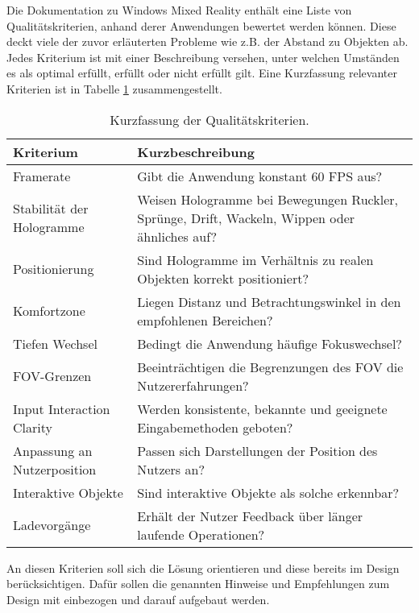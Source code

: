 Die Dokumentation zu Windows Mixed Reality enthält eine Liste von Qualitätskriterien, anhand derer Anwendungen bewertet werden können. Diese deckt viele der zuvor erläuterten Probleme wie z.B. der Abstand zu Objekten ab. Jedes Kriterium ist mit einer Beschreibung versehen, unter welchen Umständen es als optimal erfüllt, erfüllt oder nicht erfüllt gilt. Eine Kurzfassung relevanter Kriterien ist in Tabelle \ref{tab:tech_criteria} zusammengestellt.\\

\bgroup
\setlength\extrarowheight{-2pt}
\def\arraystretch{1.8}
\begin{table}[H]
	\centering
	\begin{tabular}{m{2.3cm}|m{8.5cm}}
		Kriterium & Kurzbeschreibung \\
		\hline
		\hline
		Framerate & Gibt die Anwendung konstant 60 FPS aus?\\
		\hline
		Stabilität der Hologramme & Weisen Hologramme bei Bewegungen Ruckler, Sprünge, Drift, Wackeln, Wippen oder ähnliches auf?\\
		\hline
		Positionierung & Sind Hologramme im Verhältnis zu realen Objekten korrekt positioniert?\\
		\hline
		Komfortzone & Liegen Distanz und Betrachtungswinkel in den empfohlenen Bereichen?\\
		\hline
		Tiefen Wechsel & Bedingt die Anwendung häufige Fokuswechsel?\\
		\hline
		FOV-Grenzen & Beeinträchtigen die Begrenzungen des FOV die Nutzererfahrungen?\\
		\hline
		Input Interaction Clarity & Werden konsistente, bekannte und geeignete Eingabemethoden geboten?\\
		\hline
		Anpassung an Nutzerposition & Passen sich Darstellungen der Position des Nutzers an?\\
		\hline
		Interaktive Objekte & Sind interaktive Objekte als solche erkennbar?\\
		\hline
		Ladevorgänge  & Erhält der Nutzer Feedback über länger laufende Operationen?\\
	\end{tabular}\caption{\label{tab:tech_criteria} Kurzfassung der Qualitätskriterien.}
\end{table}
\egroup

An diesen Kriterien soll sich die Lösung orientieren und diese bereits im Design berücksichtigen. Dafür sollen die genannten Hinweise und Empfehlungen zum Design mit einbezogen und darauf aufgebaut werden.\\

